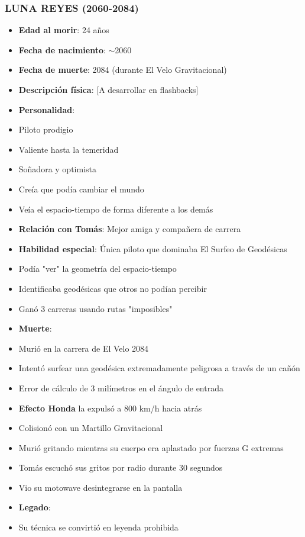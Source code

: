 \documentclass[11pt,a4paper]{report}
\begin{document}
\subsubsection{LUNA REYES (2060-2084)}
\begin{itemize}
  \item \textbf{Edad al morir}: 24 años
  \item \textbf{Fecha de nacimiento}: $\sim$2060
  \item \textbf{Fecha de muerte}: 2084 (durante El Velo Gravitacional)
  \item \textbf{Descripción física}: [A desarrollar en flashbacks]
  \item \textbf{Personalidad}: 
  \item Piloto prodigio
  \item Valiente hasta la temeridad
  \item Soñadora y optimista
  \item Creía que podía cambiar el mundo
  \item Veía el espacio-tiempo de forma diferente a los demás
  \item \textbf{Relación con Tomás}: Mejor amiga y compañera de carrera
  \item \textbf{Habilidad especial}: Única piloto que dominaba El Surfeo de Geodésicas
  \item Podía "ver" la geometría del espacio-tiempo
  \item Identificaba geodésicas que otros no podían percibir
  \item Ganó 3 carreras usando rutas "imposibles"
  \item \textbf{Muerte}: 
  \item Murió en la carrera de El Velo 2084
  \item Intentó surfear una geodésica extremadamente peligrosa a través de un cañón
  \item Error de cálculo de 3 milímetros en el ángulo de entrada
  \item \textbf{Efecto Honda} la expulsó a 800 km/h hacia atrás
  \item Colisionó con un Martillo Gravitacional
  \item Murió gritando mientras su cuerpo era aplastado por fuerzas G extremas
  \item Tomás escuchó sus gritos por radio durante 30 segundos
  \item Vio su motowave desintegrarse en la pantalla
  \item \textbf{Legado}: 
  \item Su técnica se convirtió en leyenda prohibida

\end{itemize}
\end{document}

